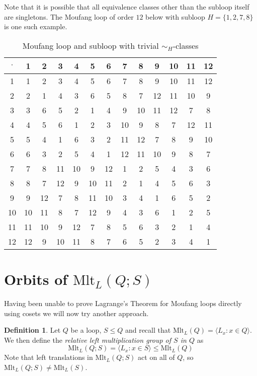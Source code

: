 \documentclass[12pt]{report}
\theoremstyle{definition}
\newtheorem{dfn}[thm]{Definition}
\newcommand{\mlt}{\text{Mlt}}       %
\begin{document}
Note that it is possible that all equivalence classes other than the subloop itself are singletons.
  The Moufang loop of order $12$ below with subloop $H = \{1, 2, 7, 8\}$ is one such example.

\begin{table}[H]
  \centering
  \begin{tabular}{c | c c c c c c c c c c c c}
    $\cdot$ & 1 & 2 & 3 & 4 & 5 & 6 & 7 & 8 & 9 & 10 & 11 & 12\\
    \hline \hline
    1 & 1 & 2 & 3 & 4 & 5 & 6 & 7 & 8 & 9 & 10 & 11 & 12 \\
    2 & 2 & 1 & 4 & 3 & 6 & 5 & 8 & 7 & 12 & 11 & 10 & 9 \\
    3 & 3 & 6 & 5 & 2 & 1 & 4 & 9 & 10 & 11 & 12 & 7 & 8 \\
    4 & 4 & 5 & 6 & 1 & 2 & 3 & 10 & 9 & 8 & 7 & 12 & 11 \\
    5 & 5 & 4 & 1 & 6 & 3 & 2 & 11 & 12 & 7 & 8 & 9 & 10 \\
    6 & 6 & 3 & 2 & 5 & 4 & 1 & 12 & 11 & 10 & 9 & 8 & 7 \\
    7 & 7 & 8 & 11 & 10 & 9 & 12 & 1 & 2 & 5 & 4 & 3 & 6 \\
    8 & 8 & 7 & 12 & 9 & 10 & 11 & 2 & 1 & 4 & 5 & 6 & 3 \\
    9 & 9 & 12 & 7 & 8 & 11 & 10 & 3 & 4 & 1 & 6 & 5 & 2 \\
    10 & 10 & 11 & 8 & 7 & 12 & 9 & 4 & 3 & 6 & 1 & 2 & 5 \\
    11 & 11 & 10 & 9 & 12 & 7 & 8 & 5 & 6 & 3 & 2 & 1 & 4 \\
    12 & 12 & 9 & 10 & 11 & 8 & 7 & 6 & 5 & 2 & 3 & 4 & 1
  \end{tabular}
  \caption{Moufang loop and subloop with trivial $\sim_H$-classes}
\end{table}


\section{Orbits of $\mlt_L(Q; S)$}

Having been unable to prove Lagrange's Theorem for Moufang loops directly using cosets we will
  now try another approach.

\begin{dfn}
  Let $Q$ be a loop, $S\leq Q$ and recall that $\mlt_L(Q) = \langle L_x : x\in Q\rangle$. We
    then define the \emph{relative left multiplication group of $S$ in $Q$} as 
  \[\mlt_L(Q; S) = \langle L_x : x\in S\rangle \leq \mlt_L(Q)\]
  Note that left translations in $\mlt_L(Q; S)$ act on all of $Q$, so $\mlt_L(Q; S)\neq \mlt_L(S)$.
\end{dfn}
\end{document}
